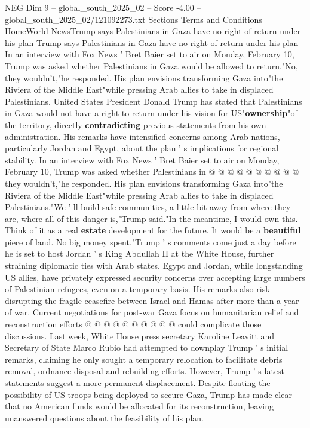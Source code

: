 \begin{textsample}{NEG Dim 9 – global\_south\_2025\_02 – Score -4.00 – global\_south\_2025\_02/121092273.txt}  \label{ex:f9_neg_063}
Sections Terms and Conditions HomeWorld NewsTrump says Palestinians in Gaza have no right of return under his plan Trump says Palestinians in Gaza have no right of return under his plan In an interview with Fox News ' Bret Baier set to air on Monday, February 10, Trump was asked whether Palestinians in Gaza would be allowed to return."No, they wouldn't,"he responded.
His plan envisions transforming Gaza into"the Riviera of the Middle East"while pressing Arab allies to take in displaced Palestinians.
United States President Donald Trump has stated that Palestinians in Gaza would not have a right to return under his vision for US"\textbf{ownership}"of the territory, directly \textbf{contradicting} previous statements from his own administration.
His remarks have intensified concerns among Arab nations, particularly Jordan and Egypt, about the plan ' s implications for regional stability.
In an interview with Fox News ' Bret Baier set to air on Monday, February 10, Trump was asked whether Palestinians in @ @ @ @ @ @ @ @ @ @ they wouldn't,"he responded.
His plan envisions transforming Gaza into"the Riviera of the Middle East"while pressing Arab allies to take in displaced Palestinians."We ' ll build safe communities, a little bit away from where they are, where all of this danger is,"Trump said."In the meantime, I would own this.
Think of it as a real \textbf{estate} development for the future.
It would be a \textbf{beautiful} piece of land.
No big money spent."Trump ' s comments come just a day before he is set to host Jordan ' s King Abdullah II at the White House, further straining diplomatic ties with Arab states.
Egypt and Jordan, while longstanding US allies, have privately expressed security concerns over accepting large numbers of Palestinian refugees, even on a temporary basis.
His remarks also risk disrupting the fragile ceasefire between Israel and Hamas after more than a year of war.
Current negotiations for post-war Gaza focus on humanitarian relief and reconstruction efforts @ @ @ @ @ @ @ @ @ @ could complicate those discussions.
Last week, White House press secretary Karoline Leavitt and Secretary of State Marco Rubio had attempted to downplay Trump ' s initial remarks, claiming he only sought a temporary relocation to facilitate debris removal, ordnance disposal and rebuilding efforts.
However, Trump ' s latest statements suggest a more permanent displacement.
Despite floating the possibility of US troops being deployed to secure Gaza, Trump has made clear that no American funds would be allocated for its reconstruction, leaving unanswered questions about the feasibility of his plan.

\end{textsample}
